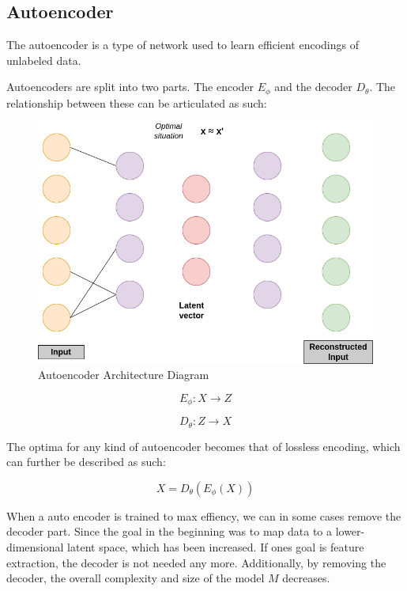 \subsection{Autoencoder}

The autoencoder is a type of network used to learn efficient encodings of unlabeled data. 

Autoencoders are split into two parts. The encoder $E_\phi$ and the decoder $D_\theta$. The relationship between these can be articulated as such: 

\begin{figure}[h]
    \centering
    \includegraphics[scale=0.5]{figures/ae.png}
    \caption{Autoencoder Architecture Diagram}
    \label{fig:aediagram}
\end{figure}

\begin{equation}
E_\phi: X \rightarrow Z 
\end{equation}

\begin{equation}
D_\theta: Z \rightarrow X
\end{equation}

The optima for any kind of autoencoder becomes that of lossless encoding, which can further be described as such:

\begin{equation}
    X = D_\theta(E_\phi(X))
\end{equation}

When a auto encoder is trained to max effiency, we can in some cases remove the decoder part. Since the goal in the beginning was to map data to a lower-dimensional latent space, which has been increased. If ones goal is feature extraction, the decoder is not needed any more. Additionally, by removing the decoder, the overall complexity and size of the model $M$ decreases.


